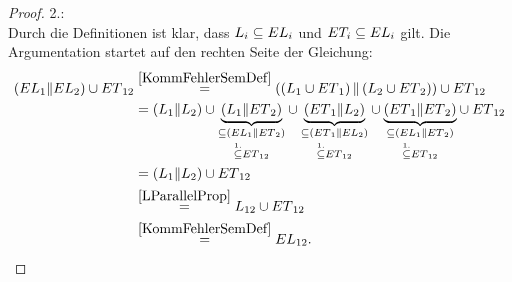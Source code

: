 \begin{proof}
  2.:\\
  Durch die Definitionen ist klar, dass $L_i\subseteq EL _i$ und $ET
  _i\subseteq EL _i$ gilt. Die Argumentation startet auf den rechten Seite der
  Gleichung:
  \begin{align*}
    (EL{}_1\| EL{}_2)\cup
    ET{}_{12}&\overset{\ref{KommFehlerSemDef}}{=}\left(\left(L_1\cup
    ET{}_1\right)\|\left(L_2\cup ET{}_2\right)\right)\cup ET{}_{12}\\
    &=(L_1\|L_2) \cup \underset{\overset{1.}{\subseteq}
    ET{}_{12}}{\underset{\subseteq
    (EL{}_1\|ET{}_2)}{\underbrace{(L_1\|ET{}_2)}}} \cup
    \underset{\overset{1.}{\subseteq} ET{}_{12}}{\underset{\subseteq
    (ET{}_1\|EL{}_2)}{\underbrace{(ET{}_1\|L_2)}}} \cup
    \underset{\overset{1.}{\subseteq} ET{}_{12}}{\underset{\subseteq
    (EL{}_1\|ET{}_2)}{\underbrace{(ET{}_1\|ET{}_2)}}} \cup ET{}_{12}\\
    &=(L_1\|L_2) \cup ET{}_{12}\\
    &\overset{\ref{LParallelProp}}{=}L_{12}\cup ET{}_{12}\\
    &\overset{\ref{KommFehlerSemDef}}{=}EL{}_{12}.
  \end{align*}
\end{proof}

